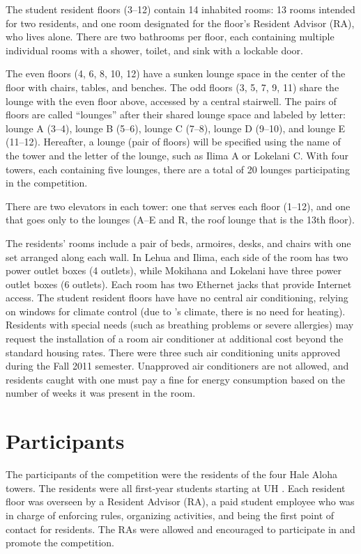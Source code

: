 The student resident floors (3--12) contain 14 inhabited rooms: 13 rooms intended for two residents, and one room designated for the floor's Resident Advisor (RA), who lives alone. There are two bathrooms per floor, each containing multiple individual rooms with a shower, toilet, and sink with a lockable door.

The even floors (4, 6, 8, 10, 12) have a sunken lounge space in the center of the floor with chairs, tables, and benches. The odd floors (3, 5, 7, 9, 11) share the lounge with the even floor above, accessed by a central stairwell. The pairs of floors are called ``lounges'' after their shared lounge space and labeled by letter: lounge A (3--4), lounge B (5--6), lounge C (7--8), lounge D (9--10), and lounge E (11--12). Hereafter, a lounge (pair of floors) will be specified using the name of the tower and the letter of the lounge, such as Ilima A or Lokelani C. With four towers, each containing five lounges, there are a total of 20 lounges participating in the competition.

There are two elevators in each tower: one that serves each floor (1--12), and one that goes only to the lounges (A--E and R, the roof lounge that is the 13th floor).

The residents' rooms include a pair of beds, armoires, desks, and chairs with one set arranged along each wall. In Lehua and Ilima, each side of the room has two power outlet boxes (4 outlets), while Mokihana and Lokelani have three power outlet boxes (6 outlets). Each room has two Ethernet jacks that provide Internet access. The student resident floors have have no central air conditioning, relying on windows for climate control (due to \Hawaii's climate, there is no need for heating). Residents with special needs (such as breathing problems or severe allergies) may request the installation of a room air conditioner at additional cost beyond the standard housing rates. There were three such air conditioning units approved during the Fall 2011 semester. Unapproved air conditioners are not allowed, and residents caught with one must pay a fine for energy consumption based on the number of weeks it was present in the room.


\section{Participants}
\label{sec:participants}

The participants of the competition were the residents of the four Hale Aloha towers. The residents were all first-year students starting at UH \Manoa. Each resident floor was overseen by a Resident Advisor (RA), a paid student employee who was in charge of enforcing rules, organizing activities, and being the first point of contact for residents. The RAs were allowed and encouraged to participate in and promote the competition.

